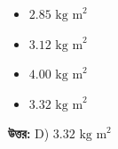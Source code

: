 \documentclass[12pt, a4paper]{article}
\begin{document}
\begin{itemize}[label={}, leftmargin=1cm, itemsep=0.5em]
\item[\textbf{A)}] $2.85\text{ kg m}^2$
\item[\textbf{B)}] $3.12\text{ kg m}^2$
\item[\textbf{C)}] $4.00\text{ kg m}^2$
\item[\textbf{D)}] $3.32\text{ kg m}^2$
\end{itemize}
\vspace{0.5em}

\begin{tcolorbox}[answerbox]
\textbf{\color{success} উত্তর:} D) $3.32\text{ kg m}^2$
\end{tcolorbox}
\vspace{1em}
\end{document}
